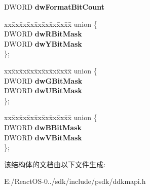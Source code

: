 \begin{DoxyCompactItemize}
D\+W\+O\+RD {\bfseries dw\+Format\+Bit\+Count}
\item 
\mbox{\label{struct___d_d_l_o_c_k_o_u_t_aa68a88033af5425fe99633f2ae3e6879}} 
\begin{tabbing}
xx\=xx\=xx\=xx\=xx\=xx\=xx\=xx\=xx\=\kill
union \{\\
\>DWORD {\bfseries dwRBitMask}\\
\>DWORD {\bfseries dwYBitMask}\\
\}; \\

\end{tabbing}\item 
\mbox{\label{struct___d_d_l_o_c_k_o_u_t_a87eb8de4d78e8268328053f51d11933b}} 
\begin{tabbing}
xx\=xx\=xx\=xx\=xx\=xx\=xx\=xx\=xx\=\kill
union \{\\
\>DWORD {\bfseries dwGBitMask}\\
\>DWORD {\bfseries dwUBitMask}\\
\}; \\

\end{tabbing}\item 
\mbox{\label{struct___d_d_l_o_c_k_o_u_t_a407c91afb407ce63bd1587db972bd0eb}} 
\begin{tabbing}
xx\=xx\=xx\=xx\=xx\=xx\=xx\=xx\=xx\=\kill
union \{\\
\>DWORD {\bfseries dwBBitMask}\\
\>DWORD {\bfseries dwVBitMask}\\
\}; \\

\end{tabbing}\end{DoxyCompactItemize}


该结构体的文档由以下文件生成\+:\begin{DoxyCompactItemize}
\item 
E\+:/\+React\+O\+S-\/0../sdk/include/psdk/ddkmapi.\+h\end{DoxyCompactItemize}
